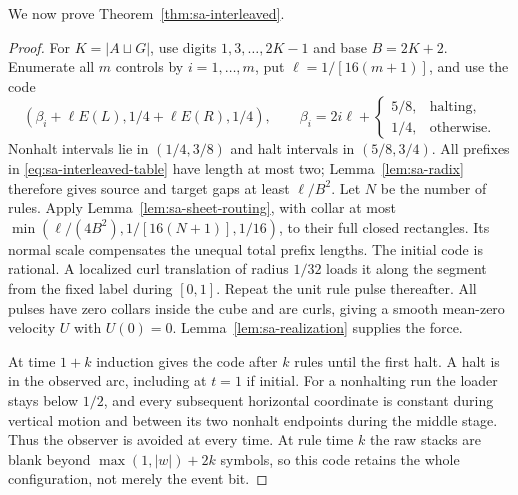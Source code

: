 We now prove Theorem~\ref{thm:sa-interleaved}.

\begin{proof}
For $K=|A\sqcup G|$, use digits $1,3,\ldots,2K-1$ and base $B=2K+2$.
Enumerate all $m$ controls by $i=1,\ldots,m$, put $\ell=1/[16(m+1)]$,
and use the code
\[
 (\beta_i+\ell E(L),1/4+\ell E(R),1/4),\qquad
 \beta_i=2i\ell+\begin{cases}5/8,&\text{halting},\\1/4,&\text{otherwise}.
 \end{cases}
\]
Nonhalt intervals lie in $(1/4,3/8)$ and halt intervals in $(5/8,3/4)$.
All prefixes in \eqref{eq:sa-interleaved-table} have length at most two;
Lemma~\ref{lem:sa-radix} therefore gives source and target gaps at least
$\ell/B^2$.  Let $N$ be the number of rules.  Apply Lemma~\ref{lem:sa-sheet-routing}, with collar at most
$\min(\ell/(4B^2),1/[16(N+1)],1/16)$, to their full closed rectangles.
Its normal scale compensates the unequal total prefix lengths.
The initial code is rational.  A localized curl translation of radius
$1/32$ loads it along the segment from the fixed label during $[0,1]$.
Repeat the unit rule pulse thereafter.  All pulses have zero collars
inside the cube and are curls, giving a smooth mean-zero velocity $U$
with $U(0)=0$.  Lemma~\ref{lem:sa-realization} supplies the force.

At time $1+k$ induction gives the code after $k$ rules until the first
halt.  A halt is in the observed arc, including at $t=1$ if initial.
For a nonhalting run the loader stays below $1/2$, and every subsequent
horizontal coordinate is constant during vertical motion and between its
two nonhalt endpoints during the middle stage.  Thus the observer is
avoided at every time.  At rule time $k$ the raw stacks are blank beyond
$\max(1,|w|)+2k$ symbols, so this code retains the whole configuration,
not merely the event bit.
\end{proof}

